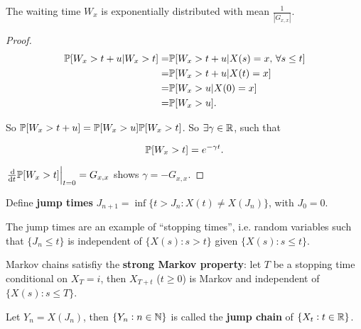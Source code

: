 \begin{proposition}
    The waiting time $W_x$ is exponentially distributed with mean $\frac{1}{|G_{x,x}|}$.

    \begin{proof}
        \begin{align*}
            \mathbb{P} [W_x > t + u | W_x  > t] = & \mathbb{P} [W_x > t+u | X(s) = x, \, \forall s \le t] \\ 
            = & \mathbb{P} [W_x > t + u | X(t) = x] \\ 
            = & \mathbb{P} [W_x > u | X(0) = x] \\ 
            = & \mathbb{P} [W_x > u].
        \end{align*}

        So $\mathbb{P} [W_x > t + u] = \mathbb{P} [W_x > u] \mathbb{P} [W_x > t]$. So $\exists \gamma \in \mathbb{R}$, such that
        
        \begin{equation*}
            \mathbb{P}[W_x > t] = e^{- \gamma t}.
        \end{equation*}

        $\left. \frac{\dif}{\dif t} \Prob[W_x > t] \right|_{t = 0} = G_{x,x}$ shows $\gamma = - G_{x,x}$. 
    \end{proof}
\end{proposition}

\begin{definition}
    Define \textbf{jump times} $J_{n+1} = \inf \{ t > J_n: X(t) \neq X(J_n)\}$, with $J_0 = 0$.
\end{definition}

\begin{remark}
    The jump times are an example of ``stopping times'', i.e. random variables such that $\{J_n \le t\}$ is independent of $\{ X(s): s > t\}$ given $\{ X(s): s \le t\}$.
\end{remark}

\begin{theorem}
    Markov chains satisfiy the \textbf{strong Markov property}: let $T$ be a stopping time conditional on $X_T = i$, then $X_{T+t}$ ($t \ge 0$) is Markov and independent of $\{X(s): s \le T\}$.
\end{theorem}

\begin{definition}
    Let $Y_n = X(J_n)$, then $\{Y_n: n \in \mathbb{N}\}$ is called the \textbf{jump chain} of $\{X_t: t \in \mathbb{R}\}$.
\end{definition}

